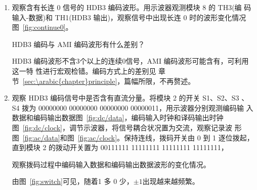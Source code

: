 \documentclass[../main]{subfiles}
\begin{document}
\begin{enumerate}
  \item 观察含有长连 0 信号的 HDB3 编码波形。用示波器观测模块 8 的 TH3(编
    码输入-数据)和 TH1(HDB3 输出)，观察信号中出现长连 0 时的波形变化情况
    图~\ref{fig:continue0}。


    \begin{Exercise}[title = 思考]
      HDB3 编码与 AMI 编码波形有什么差别？
    \end{Exercise}

    \begin{Answer}
      HDB3 编码波形不含3个以上的连续0信号，AMI 编码波形可能含有，可利用这一特
      性进行宏观检错。编码方式上的差别见
      章节~\ref{sec:\arabic{chapter}principle}，篇幅所限，不再赘述。
    \end{Answer}

  \item 观察 HDB3 编码信号中是否含有直流分量。将模块 2 的开关 S1、S2、S3
    、S4 拨为 00000000 00000000 00000000 00000011，用示波器分别观测编码输
    入数据和编码输出数据图~\ref{fig:dc/data}，编码输入时钟和译码输出时钟
    图~\ref{fig:dc/clock}，调节示波器，将信号耦合状况置为交流，观察记录波
    形图~\ref{fig:ac/data}和图~\ref{fig:ac/clock}。保持连线，拨码开关由 0
    到 1 逐位拨起，直到模块 2 的拨动开关置为 00111111 11111111 11111111
    11111111，

    \begin{Exercise}[title = 思考]
      观察拨码过程中编码输入数据和编码输出数据波形的变化情况。
    \end{Exercise}

    \begin{Answer}
      由图~\ref{fig:switch}可见，随着1 多 0 少，$\pm 1$出现越来越频繁。
    \end{Answer}


\end{enumerate}
\end{document}

